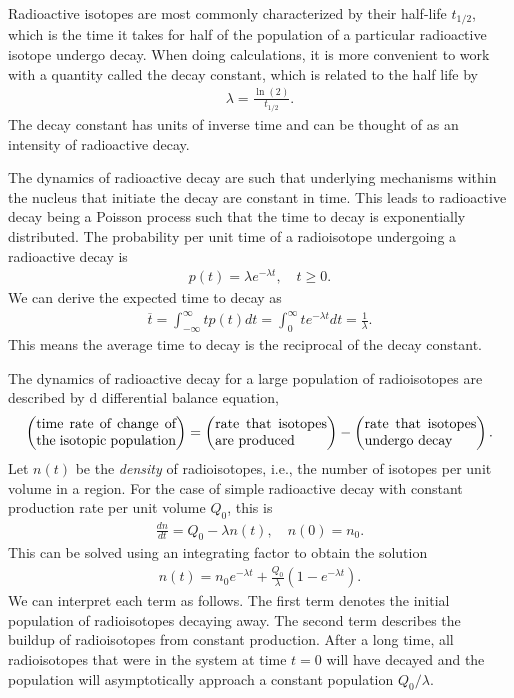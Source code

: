 Radioactive isotopes are most commonly characterized by their half-life $t_{1/2}$, which is the time it takes for half of the population of a particular radioactive isotope undergo decay. When doing calculations, it is more convenient to work with a quantity called the decay constant, which is related to the half life by
\begin{align}
  \lambda = \frac{ \ln(2) }{ t_{1/2} } .
\end{align}
The decay constant has units of inverse time and can be thought of as an intensity of radioactive decay. 

The dynamics of radioactive decay are such that underlying mechanisms within the nucleus that initiate the decay are constant in time. This leads to radioactive decay being a Poisson process such that the time to decay is exponentially distributed. The probability per unit time of a radioisotope undergoing a radioactive decay is
\begin{align}
  p(t) = \lambda e^{-\lambda t}, \quad t \ge 0.
\end{align}
We can derive the expected time to decay as
\begin{align}
  \overline{t} = \int_{-\infty}^\infty t p(t) dt = \int_0^\infty t e^{-\lambda t} dt = \frac{1}{\lambda}.
\end{align}
This means the average time to decay is the reciprocal of the decay constant.

The dynamics of radioactive decay for a large population of radioisotopes are described by d differential balance equation,
\begin{align}
  \left( \parbox{10em}{time rate of change of the isotopic population} \right) = 
  \left( \parbox{8em}{rate that isotopes are produced} \right) - 
  \left( \parbox{8em}{rate that isotopes undergo decay} \right). \nonumber
\end{align}
Let $n(t)$ be the \emph{density} of radioisotopes, i.e., the number of isotopes per unit volume in a region. For the case of simple radioactive decay with constant production rate per unit volume $Q_0$, this is
\begin{align}
  \frac{dn}{dt} = Q_0 -\lambda n(t) , \quad n(0) = n_0 .
\end{align}
This can be solved using an integrating factor to obtain the solution
\begin{align}
  n(t) = n_0 e^{-\lambda t} + \frac{Q_0}{\lambda} ( 1 - e^{-\lambda t} ) .
\end{align}
We can interpret each term as follows. The first term denotes the initial population of radioisotopes decaying away. The second term describes the buildup of radioisotopes from constant production. After a long time, all radioisotopes that were in the system at time $t = 0$ will have decayed and the population will asymptotically approach a constant population $Q_0/\lambda$.

